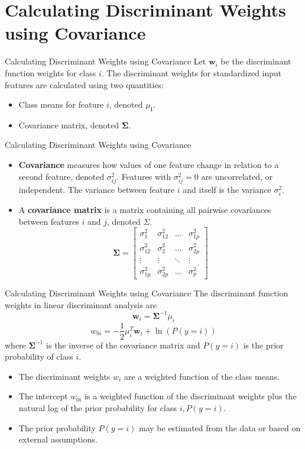 \documentclass[10pt,dvipsnames]{beamer}
\begin{document}
\section{Calculating Discriminant Weights using Covariance}
\begin{frame}{Calculating Discriminant Weights using Covariance}
	Let \(\mathbf{w}_{i}\) be the discriminant function weights for class \(i\). The discriminant weights for standardized input features are calculated using two quantities:
	\begin{itemize}
		\item Class means for feature \(i\), denoted \(\mu_{\mathbf{i}}\).
		\item Covariance matrix, denoted \(\boldsymbol{\Sigma}\).
	\end{itemize}
\end{frame}

\begin{frame}{Calculating Discriminant Weights using Covariance}
	\begin{itemize}
		\item \textbf{Covariance} measures how values of one feature change in relation to a second feature, denoted \(\sigma_{i j}^{2}\). Features with \(\sigma_{i j}^{2}=0\) are uncorrelated, or independent. The variance between feature \(i\) and itself is the variance \(\sigma_{i}^{2}\).
		\item  A \textbf{covariance matrix} is a matrix containing all pairwise covariances between features \(i\) and \(j\), denoted \(\Sigma\).
		      $$
			      \boldsymbol{\Sigma}=\left[\begin{array}{cccc}\sigma_{1}^{2} & \sigma_{12}^{2} & \ldots & \sigma_{1 p}^{2} \\ \sigma_{12}^{2} & \sigma_{2}^{2} & \ldots & \sigma_{2 p}^{2} \\ \vdots & \vdots & \ddots & \vdots \\ \sigma_{1 p}^{2} & \sigma_{2 p}^{2} & \ldots & \sigma_{p}^{2}\end{array}\right]
		      $$
	\end{itemize}
\end{frame}

\begin{frame}{Calculating Discriminant Weights using Covariance}
	The discriminant function weights in linear discriminant analysis are
	$$
		\mathbf{w}_{i}=\boldsymbol{\Sigma}^{-1} \mu_{i}
	$$
	$$
		w_{0 i}=-\frac{1}{2} \mu_{i}^{T} \mathbf{w}_{i}+\ln (P(y=i))
	$$
	where \(\boldsymbol{\Sigma}^{-1}\) is the inverse of the covariance matrix and \(P(y=i)\) is the prior probability of class \(i\).

	\begin{itemize}
		\item The discriminant weights \(w_{i}\) are a weighted function of the class means.
		\item The intercept \(w_{0 i}\) is a weighted function of the discriminant weights plus the natural log of the prior probability for class \(i, P(y=i)\).
		\item The prior probability \(P(y=i)\) may be estimated from the data or based on external assumptions.
	\end{itemize}
\end{frame}
\end{document}
